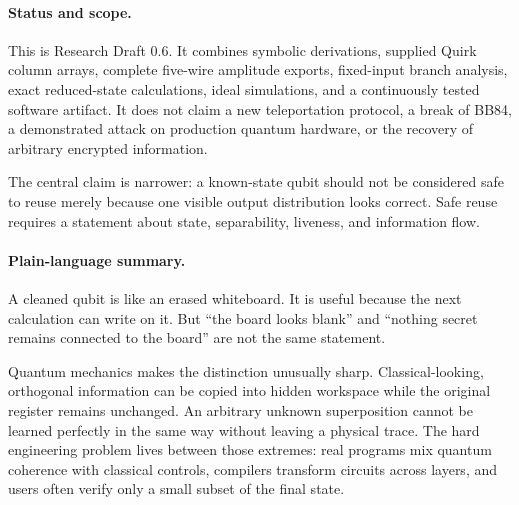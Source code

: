 \paragraph{Status and scope.}
This is Research Draft 0.6. It combines symbolic derivations, supplied Quirk
column arrays, complete five-wire amplitude exports, fixed-input branch analysis, exact reduced-state
calculations, ideal simulations, and a continuously tested software artifact. It does not claim a new teleportation
protocol, a break of BB84, a demonstrated attack on production quantum hardware,
or the recovery of arbitrary encrypted information.

The central claim is narrower: a known-state qubit should not be considered safe
to reuse merely because one visible output distribution looks correct. Safe
reuse requires a statement about state, separability, liveness, and information
flow.

\paragraph{Plain-language summary.}
A cleaned qubit is like an erased whiteboard. It is useful because the next
calculation can write on it. But ``the board looks blank'' and ``nothing secret
remains connected to the board'' are not the same statement.

Quantum mechanics makes the distinction unusually sharp. Classical-looking,
orthogonal information can be copied into hidden workspace while the original
register remains unchanged. An arbitrary unknown superposition cannot be
learned perfectly in the same way without leaving a physical trace. The hard
engineering problem lives between those extremes: real programs mix quantum
coherence with classical controls, compilers transform circuits across layers,
and users often verify only a small subset of the final state.
